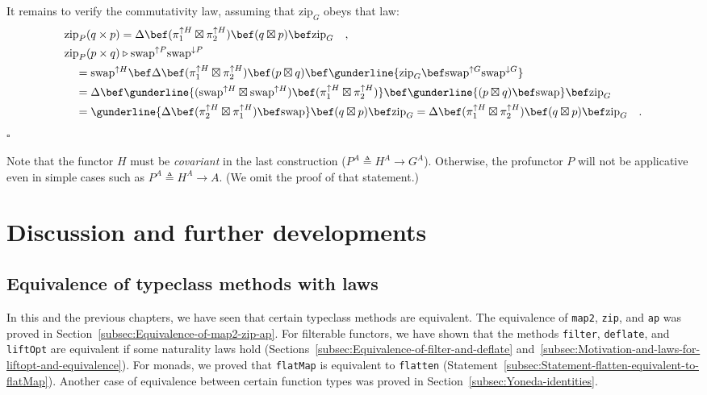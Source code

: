 It remains to verify the commutativity law, assuming that $\text{zip}_{G}$
obeys that law:
\begin{align*}
 & \text{zip}_{P}(q\times p)=\Delta\bef(\pi_{1}^{\uparrow H}\boxtimes\pi_{2}^{\uparrow H})\bef(q\boxtimes p)\bef\text{zip}_{G}\quad,\\
 & \text{zip}_{P}(p\times q)\triangleright\text{swap}^{\uparrow P}\text{swap}^{\downarrow P}\\
 & \quad=\text{swap}^{\uparrow H}\bef\Delta\bef(\pi_{1}^{\uparrow H}\boxtimes\pi_{2}^{\uparrow H})\bef(p\boxtimes q)\bef\gunderline{\text{zip}_{G}\bef\text{swap}^{\uparrow G}\text{swap}^{\downarrow G}}\\
 & \quad=\Delta\bef\gunderline{(\text{swap}^{\uparrow H}\boxtimes\text{swap}^{\uparrow H})\bef(\pi_{1}^{\uparrow H}\boxtimes\pi_{2}^{\uparrow H})}\bef\gunderline{(p\boxtimes q)\bef\text{swap}}\bef\text{zip}_{G}\\
 & \quad=\gunderline{\Delta\bef(\pi_{2}^{\uparrow H}\boxtimes\pi_{1}^{\uparrow H})\bef\text{swap}}\bef(q\boxtimes p)\bef\text{zip}_{G}=\Delta\bef(\pi_{1}^{\uparrow H}\boxtimes\pi_{2}^{\uparrow H})\bef(q\boxtimes p)\bef\text{zip}_{G}\quad.
\end{align*}
$\square$

Note that the functor $H$ must be \emph{covariant} in the last construction
($P^{A}\triangleq H^{A}\rightarrow G^{A}$). Otherwise, the profunctor
$P$ will not be applicative even in simple cases such as $P^{A}\triangleq H^{A}\rightarrow A$.
(We omit the proof of that statement.)

\section{Discussion and further developments}

\subsection{Equivalence of typeclass methods with laws}

In this and the previous chapters, we have seen that certain typeclass
methods are equivalent. The equivalence of \lstinline!map2!, \lstinline!zip!,
and \lstinline!ap! was proved in Section~\ref{subsec:Equivalence-of-map2-zip-ap}.
For filterable functors, we have shown that the methods \lstinline!filter!,
\lstinline!deflate!, and \lstinline!liftOpt! are equivalent if some
naturality laws hold (Sections~\ref{subsec:Equivalence-of-filter-and-deflate}
and~\ref{subsec:Motivation-and-laws-for-liftopt-and-equivalence}).
For monads, we proved that \lstinline!flatMap! is equivalent to \lstinline!flatten!
(Statement~\ref{subsec:Statement-flatten-equivalent-to-flatMap}).
Another case of equivalence between certain function types was proved
in Section~\ref{subsec:Yoneda-identities}. 

